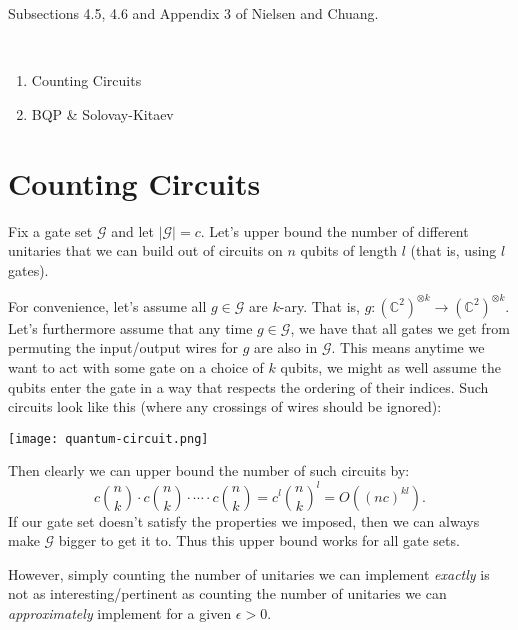 \documentclass{article}
\newcommand{\bbC}{\mathbb{C}}
\newcommand{\calG}{\mathcal{G}}
\begin{document}
\noindent
{}

\vspace{.3cm}

 Subsections 4.5, 4.6 and Appendix 3 of Nielsen and Chuang. 

\

\begin{enumerate}
     \item Counting Circuits
     \item BQP \& Solovay-Kitaev
\end{enumerate}

\section{Counting Circuits}
Fix a gate set \(\calG\) and let \(|\calG| = c\).  Let's upper bound the number of different unitaries that we can build out of circuits on \(n\) qubits of length \(l\) (that is, using \(l\) gates).

For convenience, let's assume all \(g \in \calG\) are \(k\)-ary. That is, \(g : (\bbC^2)^{\otimes k} \to (\bbC^2)^{\otimes k}\).  Let's furthermore assume that any time $g \in \calG$, we have that all gates we get from permuting the input/output wires for $g$ are also in $\calG$.  This means anytime we want to act with some gate on a choice of $k$ qubits, we might as well assume the qubits enter the gate in a way that respects the ordering of their indices.  Such circuits look like this (where any crossings of wires should be ignored):
\begin{center}
    \texttt{[image: quantum-circuit.png]}
\end{center}
Then clearly we can upper bound the number of such circuits by:
\[ c \binom{n}{k} \cdot c \binom{n}{k} \cdot \dotsb \cdot c \binom{n}{k} = c^l \binom{n}{k}^l = O((nc)^{kl}). \]
If our gate set doesn't satisfy the properties we imposed, then we can always make $\calG$ bigger to get it to.  Thus this upper bound works for all gate sets.

However, simply counting the number of unitaries we can implement \emph{exactly} is not as interesting/pertinent as counting the number of unitaries we can \emph{approximately} implement for a given $\epsilon >0$.
\end{document}
